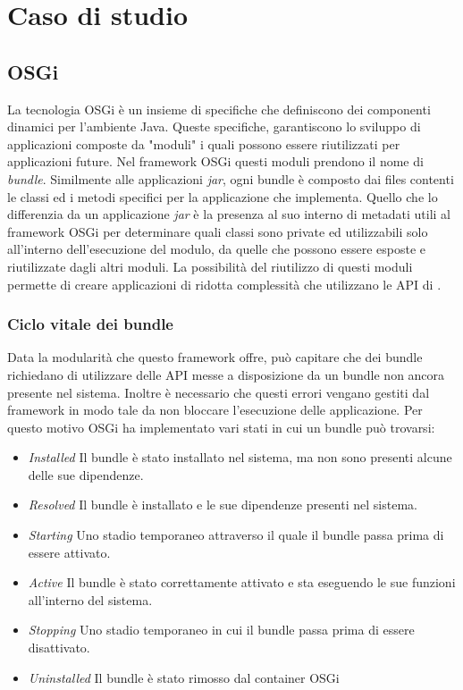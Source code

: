 \chapter{Caso di studio}
\section{OSGi}
La tecnologia OSGi è un insieme di specifiche che definiscono dei componenti
dinamici per l'ambiente Java. Queste specifiche, garantiscono lo sviluppo di
applicazioni composte da "moduli" i quali possono essere riutilizzati per
applicazioni future. Nel framework OSGi questi moduli prendono il nome di
\emph{bundle}. Similmente  alle applicazioni \emph{jar}, ogni bundle è composto
dai files contenti le classi ed i metodi specifici per la applicazione che
implementa. Quello che lo differenzia da un applicazione \emph{jar} è la
presenza al suo interno di metadati utili al framework OSGi per determinare
quali classi sono private ed utilizzabili solo all'interno dell'esecuzione del
modulo, da quelle che possono essere esposte e riutilizzate dagli altri moduli.
La possibilità del riutilizzo di questi moduli permette di
creare applicazioni di ridotta complessità che utilizzano le API di .
\subsection{Ciclo vitale dei bundle}
Data la modularità che questo framework offre, può capitare che dei bundle
richiedano di utilizzare delle API messe a disposizione da un bundle non ancora
presente nel sistema. Inoltre è necessario che questi errori vengano gestiti dal
framework in modo tale da non bloccare l'esecuzione delle applicazione.
Per questo motivo OSGi ha implementato vari stati in cui un bundle può trovarsi:
\begin{itemize}
        \item   \textit{Installed} Il bundle è stato installato nel sistema, ma
                non sono presenti alcune delle sue dipendenze.
        \item   \textit{Resolved} Il bundle è installato e le sue dipendenze
                presenti nel sistema.
        \item   \textit{Starting} Uno stadio temporaneo attraverso il quale il
                bundle passa prima di essere attivato.
        \item   \textit{Active} Il bundle è stato correttamente attivato e sta
                eseguendo le sue funzioni all'interno del sistema.
        \item   \textit{Stopping} Uno stadio temporaneo in cui il bundle passa
                prima di essere disattivato.
        \item   \textit{Uninstalled} Il bundle è stato rimosso dal container
                OSGi
\end{itemize}
